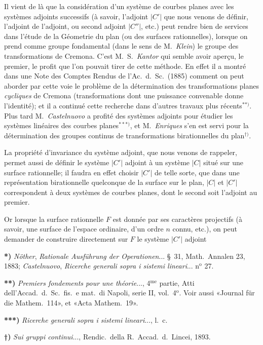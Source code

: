 \documentclass{article}
\begin{document}
Il vient de là que la considération d'un système de courbes planes avec les systèmes adjoints successifs (à savoir, l'adjoint $|C'|$ que nous venons de définir, l'adjoint de l'adjoint, ou second adjoint $|C''|$, etc.) peut rendre bien de services dans l'étude de la Géometrie du plan (ou des surfaces rationnelles), lorsque on prend comme groupe fondamental (dans le sens de M.\ \emph{Klein}) le groupe des transformations de Cremona. C'est M.\ S.\ \emph{Kantor} qui semble avoir aperçu, le premier, le profit que l'on pouvait tirer de cette méthode. En effet il a montré dans une Note des Comptes Rendus de l'Ac.\ d.\ Sc.\ (1885) comment on peut aborder par cette voie le problème de la détermination des transformations planes \emph{cycliques} de Cremona (transformations dont une puissance convenable donne l'identité); et il a continué cette recherche dans d'autres travaux plus récents${}^{**)}$. Plus tard M.\ \emph{Castelnuovo} a profité des systèmes adjoints pour étudier les systèmes linéaires des courbes planes${}^{***)}$, et M.\ \emph{Enriques} s'en est servi pour la détermination des groupes continus de transformations birationnelles du plan${}^{\dagger)}$.

La propriété d'invariance du système adjoint, que nous venons de rappeler, permet aussi de définir le système $|C'|$ adjoint à un système $|C|$ situé sur une surface rationnelle; il faudra en effet choisir $|C'|$ de telle sorte, que dans une représentation birationnelle quelconque de la surface sur le plan, $|C|$ et $|C'|$ correspondent à deux systèmes de courbes planes, dont le second soit l'adjoint au premier.

Or lorsque la surface rationnelle $F$ est donnée par ses caractères projectifs (à savoir, une surface de l'espace ordinaire, d'un ordre $n$ connu, etc.), on peut demander de construire directement sur $F$ le système $|C'|$ adjoint

\textbf{*)} \emph{Nöther}, \emph{Rationale Ausführung der Operationen}... §~31, Math.\ Annalen 23, 1883; \emph{Castelnuovo}, \emph{Ricerche generali sopra i sistemi lineari}... n${}^{\text{o}}$ 27.

\textbf{**)} \emph{Premiers fondements pour une théorie}..., 4${}^{\text{me}}$ partie, Atti dell'Accad.\ d.\ Sc.\ fis.\ e mat.\ di Napoli, serie II, vol.\ 4${}^{\text{o}}$. Voir aussi «Journal für die Mathem.\ 114», et «Acta Mathem.\ 19».

\textbf{***)} \emph{Ricerche generali sopra i sistemi lineari}..., l.\ c.

\textbf{†)} \emph{Sui gruppi continui}..., Rendic.\ della R.\ Accad.\ d.\ Lincei, 1893.
\end{document}

